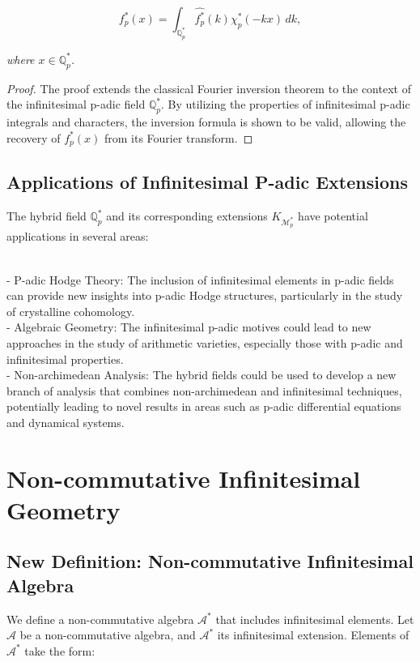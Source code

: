 \documentclass{article}
\begin{document}
\[
f_p^*(x) = \int_{\mathbb{Q}_{p}^*} \widehat{f_p^*}(k) \chi_p^*(-kx) \, dk,
\]

\textit{where \(x \in \mathbb{Q}_{p}^*\).}

\begin{proof}
The proof extends the classical Fourier inversion theorem to the context of the infinitesimal p-adic field \(\mathbb{Q}_{p}^*\). By utilizing the properties of infinitesimal p-adic integrals and characters, the inversion formula is shown to be valid, allowing the recovery of \(f_p^*(x)\) from its Fourier transform.
\end{proof}

\subsection{Applications of Infinitesimal P-adic Extensions}
The hybrid field \(\mathbb{Q}_{p}^*\) and its corresponding extensions \(K_{\mathcal{M}_{p}^*}\) have potential applications in several areas:

{\ }\\
- P-adic Hodge Theory: The inclusion of infinitesimal elements in p-adic fields can provide new insights into p-adic Hodge structures, particularly in the study of crystalline cohomology.
{\ }\\
- Algebraic Geometry: The infinitesimal p-adic motives could lead to new approaches in the study of arithmetic varieties, especially those with p-adic and infinitesimal properties.
{\ }\\
- Non-archimedean Analysis: The hybrid fields could be used to develop a new branch of analysis that combines non-archimedean and infinitesimal techniques, potentially leading to novel results in areas such as p-adic differential equations and dynamical systems.

\section{Non-commutative Infinitesimal Geometry}
\subsection{New Definition: Non-commutative Infinitesimal Algebra}
We define a non-commutative algebra \(\mathcal{A}^*\) that includes infinitesimal elements. Let \(\mathcal{A}\) be a non-commutative algebra, and \(\mathcal{A}^*\) its infinitesimal extension. Elements of \(\mathcal{A}^*\) take the form:
\end{document}
